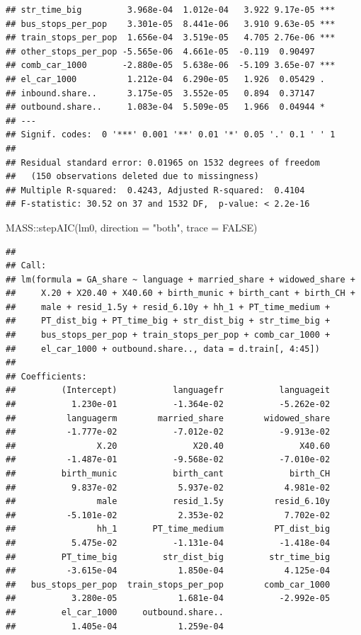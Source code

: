 \documentclass[
]{article}
\newenvironment{Shaded}{\begin{snugshade}}{\end{snugshade}}
\newcommand{\AttributeTok}[1]{\textcolor[rgb]{0.77,0.63,0.00}{#1}}
\newcommand{\ConstantTok}[1]{\textcolor[rgb]{0.00,0.00,0.00}{#1}}
\newcommand{\FunctionTok}[1]{\textcolor[rgb]{0.00,0.00,0.00}{#1}}
\newcommand{\NormalTok}[1]{#1}
\newcommand{\SpecialCharTok}[1]{\textcolor[rgb]{0.00,0.00,0.00}{#1}}
\newcommand{\StringTok}[1]{\textcolor[rgb]{0.31,0.60,0.02}{#1}}
\begin{document}
\begin{verbatim}
## str_time_big         3.968e-04  1.012e-04   3.922 9.17e-05 ***
## bus_stops_per_pop    3.301e-05  8.441e-06   3.910 9.63e-05 ***
## train_stops_per_pop  1.656e-04  3.519e-05   4.705 2.76e-06 ***
## other_stops_per_pop -5.565e-06  4.661e-05  -0.119  0.90497    
## comb_car_1000       -2.880e-05  5.638e-06  -5.109 3.65e-07 ***
## el_car_1000          1.212e-04  6.290e-05   1.926  0.05429 .  
## inbound.share..      3.175e-05  3.552e-05   0.894  0.37147    
## outbound.share..     1.083e-04  5.509e-05   1.966  0.04944 *  
## ---
## Signif. codes:  0 '***' 0.001 '**' 0.01 '*' 0.05 '.' 0.1 ' ' 1
## 
## Residual standard error: 0.01965 on 1532 degrees of freedom
##   (150 observations deleted due to missingness)
## Multiple R-squared:  0.4243, Adjusted R-squared:  0.4104 
## F-statistic: 30.52 on 37 and 1532 DF,  p-value: < 2.2e-16
\end{verbatim}

\begin{Shaded}
\begin{Highlighting}[]
\NormalTok{MASS}\SpecialCharTok{::}\FunctionTok{stepAIC}\NormalTok{(lm0, }\AttributeTok{direction =} \StringTok{"both"}\NormalTok{, }\AttributeTok{trace =} \ConstantTok{FALSE}\NormalTok{)}
\end{Highlighting}
\end{Shaded}

\begin{verbatim}
## 
## Call:
## lm(formula = GA_share ~ language + married_share + widowed_share + 
##     X.20 + X20.40 + X40.60 + birth_munic + birth_cant + birth_CH + 
##     male + resid_1.5y + resid_6.10y + hh_1 + PT_time_medium + 
##     PT_dist_big + PT_time_big + str_dist_big + str_time_big + 
##     bus_stops_per_pop + train_stops_per_pop + comb_car_1000 + 
##     el_car_1000 + outbound.share.., data = d.train[, 4:45])
## 
## Coefficients:
##         (Intercept)           languagefr           languageit  
##           1.230e-01           -1.364e-02           -5.262e-02  
##          languagerm        married_share        widowed_share  
##          -1.777e-02           -7.012e-02           -9.913e-02  
##                X.20               X20.40               X40.60  
##          -1.487e-01           -9.568e-02           -7.010e-02  
##         birth_munic           birth_cant             birth_CH  
##           9.837e-02            5.937e-02            4.981e-02  
##                male           resid_1.5y          resid_6.10y  
##          -5.101e-02            2.353e-02            7.702e-02  
##                hh_1       PT_time_medium          PT_dist_big  
##           5.475e-02           -1.131e-04           -1.418e-04  
##         PT_time_big         str_dist_big         str_time_big  
##          -3.615e-04            1.850e-04            4.125e-04  
##   bus_stops_per_pop  train_stops_per_pop        comb_car_1000  
##           3.280e-05            1.681e-04           -2.992e-05  
##         el_car_1000     outbound.share..  
##           1.405e-04            1.259e-04
\end{verbatim}
\end{document}
